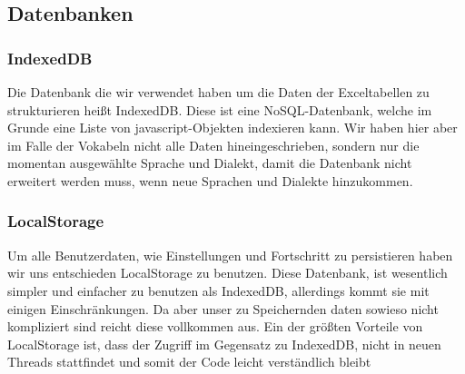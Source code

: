 \subsection{Datenbanken}
\subsubsection*{IndexedDB}
Die Datenbank die wir verwendet haben um die Daten der Exceltabellen zu strukturieren heißt IndexedDB. Diese ist eine NoSQL-Datenbank, welche im Grunde eine Liste von javascript-Objekten indexieren kann. Wir haben hier aber im Falle der Vokabeln nicht alle Daten hineingeschrieben, sondern nur die momentan ausgewählte Sprache und Dialekt, damit die Datenbank nicht erweitert werden muss, wenn neue Sprachen und Dialekte hinzukommen.

\subsubsection*{LocalStorage}
Um alle Benutzerdaten, wie Einstellungen und Fortschritt zu persistieren haben wir uns entschieden LocalStorage zu benutzen. Diese Datenbank, ist wesentlich simpler und einfacher zu benutzen als IndexedDB, allerdings kommt sie mit einigen Einschränkungen. Da aber unser zu Speichernden daten sowieso nicht kompliziert sind reicht diese vollkommen aus. Ein der größten Vorteile von LocalStorage ist, dass der Zugriff im Gegensatz zu IndexedDB, nicht in neuen Threads stattfindet und somit der Code leicht verständlich bleibt
